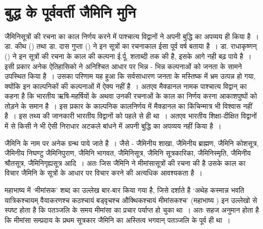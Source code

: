 \vskip 10pt

\begin{myquote}

~\hfill {}
\end{myquote}



\section*{बुद्ध के पूर्ववर्ती जैमिनि मुनि}

जैमिनिसूत्रों की रचना का काल निर्णय करने में पाश्चात्य विद्वानों ने अपनी बुद्धि का अपव्यय ही किया है~। डा. कीथ () तथा डा. दास गुप्ता () ने इन सूत्रों का रचनाकाल ईसा पूर्व  वर्ष बताया है~। डा. राधाकृष्णन् () ने इन सूत्रों की रचना के काल की कल्पना ई.र्पू. शताब्दी तक की है, इसके आगे नही बढ़ पाये है~। इसी प्रकार अनेक ऐतिहासिको ने अनिश्चित आधार पर भिन्न - भिन्न कल्पनाओं को जनता के सामने उपस्थित किया है~। उसका परिणाम यह हुआ कि सर्वसाधारण जनता के मस्तिष्क में भ्रम उत्पन्न हो गया, क्योंकि इन काल्पनिकों की कल्पनाओं में ऐक्य नहीं है~। अतएव मैक्डानल  नामक पाश्चात्य विद्वान् का कहना है कि भारतीय ऋषि-महर्षियों के अथवा उनकी रचनाओं के काल का निर्णय करना आकाशपुष्पों को तोड़ने के समान है~। इस प्रकार के काल्पनिक कालनिर्णय में मैक्डानल का किंचिन्मात्र भी विश्वास नहीं है~। इस तथ्य की जानकारी भारतीय विद्वानों को पहले से ही था~। अतएव भारतीय शिक्षा-दीक्षित विद्वानों में से किसी ने भी ऐसी निराधार अटकले बांधने में अपनी बुद्धि का अपव्यय नहीं किया है~। 


जैमिनि के नाम पर अनेक ग्रन्थ पाये जाते है~। जैसे - जैमिनीय शाखा, जैमिनीय ब्राह्मण, जैमिनि कोशसूत्र, जैमिनीय निघण्टु जैमिनिपुराण, जैमिनि भागवत, जैमिनिसूत्र, जैमिनि सूत्रकारिका, जैमिनिस्मृति, जैमिनीय श्रौतसूत्र, जैमिनिगृह्यसूत्र आदि~। अतः जिस जैमिनि ने मीमांसासूत्रों की रचना की है उसके काल का विचार जैमिनि के सूत्रों के आधार पर विचार करने की अत्यधिक आवश्यकता है~। 

महाभाष्य में ‘मीमांसक' शब्द का उल्लेख बार-बार किया गया है, जिसे दर्शाते है ‘अथेह कस्मान्न भवति यात्रिकश्चायम् वैयाकरणश्च कठश्चायं बड्वृचश्च औक्थिकश्चायं मीमांसकश्च' (महाभाष्य ) इन उल्लेखो से स्पष्ट होता है कि पतञ्जलि के समय मीमांसा का प्रचार पर्याप्त हो चुका था~। अतः सहज अनुमान होता है कि मीमांसा सम्प्रदाय के प्रथम सूत्रकार जैमिनि का अस्तित्व भगवान् पतञ्जलि के पूर्व ही था~।

